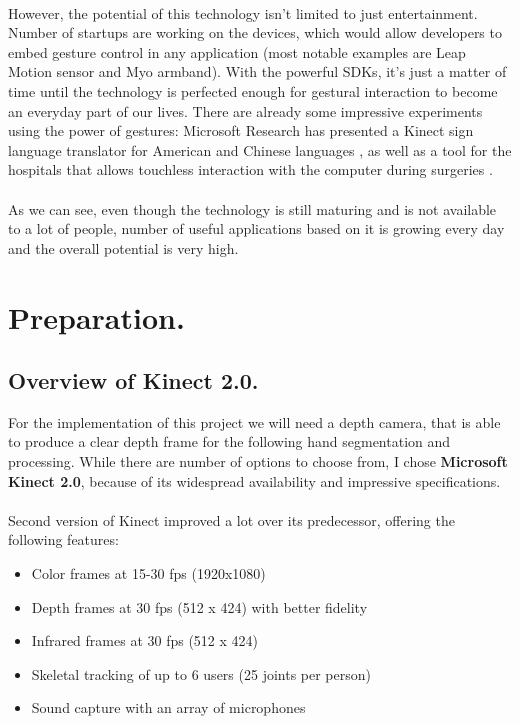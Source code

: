\documentclass[a4paper,11pt,oneside]{article}
\begin{document}
  \\
  However, the potential of this technology isn't limited to just entertainment. Number of startups are working on the devices, which would allow developers to embed gesture control in any application (most notable examples are Leap Motion sensor and Myo armband). With the powerful SDKs, it's just a matter of time until the technology is perfected enough for gestural interaction to become an everyday part of our lives. There are already some impressive experiments using the power of gestures: Microsoft Research has presented a Kinect sign language translator for American and Chinese languages \cite{MS02}, as well as a tool for the hospitals that allows touchless interaction with the computer during surgeries \cite{MS03}.\\
  \\
  As we can see, even though the technology is still maturing and is not available to a lot of people, number of useful applications based on it is growing every day and the overall potential is very high.
  

 \section{Preparation.}

\subsection{Overview of Kinect 2.0.}

For the implementation of this project we will need a depth camera, that is able to produce a clear depth frame for the following hand segmentation and processing. While there are number of options to choose from, I chose \textbf{Microsoft Kinect 2.0}, because of its widespread availability and impressive specifications.\\
\\
Second version of Kinect improved a lot over its predecessor, offering the following features:

\begin{itemize}
\item Color frames at 15-30 fps (1920x1080)
\item Depth frames at 30 fps (512 x 424) with better fidelity
\item Infrared frames at 30 fps (512 x 424)
\item Skeletal tracking of up to 6 users (25 joints per person)
\item Sound capture with an array of microphones
\end{itemize}
\end{document}
